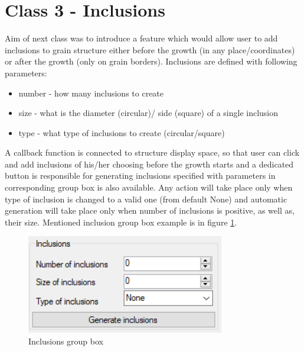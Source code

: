 \documentclass[a4paper, 11pt]{article}
\begin{document}
\section*{Class 3 - Inclusions}
Aim of next class was to introduce a feature which would allow user to add inclusions to grain structure either before the growth (in any place/coordinates) or after the growth (only on grain borders).
Inclusions are defined with following parameters:
\begin{itemize}
\item number - how many inclusions to create
\item size - what is the diameter (circular)/ side (square) of a single inclusion
\item type - what type of inclusions to create (circular/square)
\end{itemize}
A callback function is connected to structure display space, so that user can click and add inclusions of his/her choosing before the growth starts and a dedicated button is responsible for generating inclusions specified with parameters in corresponding group box is also available.\newline
Any action will take place only when type of inclusion is changed to a valid one (from default None) and automatic generation will take place only when number of inclusions is positive, as well as, their size. Mentioned inclusion group box example is in figure \ref{InclusionsGroupBoxLabel}.
\begin{figure}[H]
\centering
  \includegraphics[]{InclusionsGroupBox}
  \caption{Inclusions group box}
  \label{InclusionsGroupBoxLabel}
\end{figure}
\end{document}
